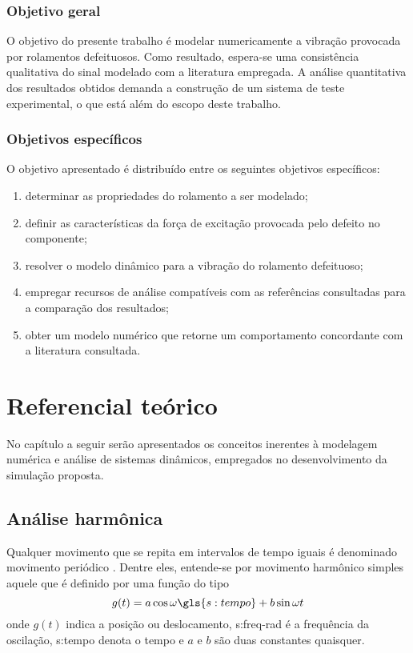 \documentclass[12pt,oneside,english,brazil,lmodern,siglas,simbolos,cite=num]{ucsmonograph}
\begin{document}
	\subsection{Objetivo geral}
	O objetivo do presente trabalho é modelar numericamente a vibração provocada por rolamentos defeituosos.
	Como resultado, espera-se uma consistência qualitativa do sinal modelado com a literatura empregada.
	A análise quantitativa dos resultados obtidos demanda a construção de um sistema de teste experimental, o que está além do escopo deste trabalho.
	
	\subsection{Objetivos específicos} \label{sec:objetivos:especificos}
	O objetivo apresentado é distribuído entre os seguintes objetivos específicos:
	\begin{enumerate}
		\item determinar as propriedades do rolamento a ser modelado;
		\item definir as características da força de excitação provocada pelo defeito no componente;
		\item resolver o modelo dinâmico para a vibração do rolamento defeituoso;
		\item empregar recursos de análise compatíveis com as referências consultadas para a comparação dos resultados;
		\item obter um modelo numérico que retorne um comportamento concordante com a literatura consultada.
	\end{enumerate}

	\chapter{Referencial teórico}
	No capítulo a seguir serão apresentados os conceitos inerentes à modelagem numérica e análise de sistemas dinâmicos, empregados no desenvolvimento da simulação proposta.
	
	\section{Análise harmônica}
	Qualquer movimento que se repita em intervalos de tempo iguais é denominado movimento periódico \cite{rao:2008}.
	Dentre eles, entende-se por movimento harmônico simples aquele que é definido por uma função do tipo \cite{timoshenko:1974}
	\begin{equation}
		g(t) = a\cos\omega \gls{s:tempo} + b\sin\omega t
	\end{equation}
	onde $g(t)$ indica a posição ou deslocamento, \gls{s:freq-rad} é a frequência da oscilação, \gls{s:tempo} denota o tempo e $ a $ e $ b $ são duas constantes quaisquer.
	
\end{document}
